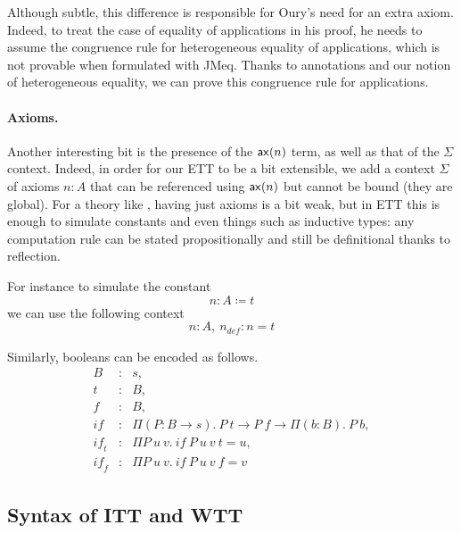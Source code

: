 Although subtle, this difference is responsible for Oury's need for an
extra axiom. Indeed, to treat the case of equality of applications in
his proof, he needs to assume the congruence rule for heterogeneous
equality of applications, which is not provable when formulated with
\acrshort{JMeq}. Thanks to annotations and our notion of heterogeneous equality,
we can prove this congruence rule for applications.

\paragraph{Axioms.}

Another interesting bit is the presence of the \(\mathsf{ax}(n)\) term, as well as
that of the \(\Sigma\) context. Indeed, in order for our \acrshort{ETT} to be
a bit extensible, we add a context \(\Sigma\) of axioms \(n : A\) that can be
referenced using \(\mathsf{ax}(n)\) but cannot be bound (they are global).
For a theory like \Coq, having just axioms is a bit weak, but in \acrshort{ETT}
this is enough to simulate constants and even things such as inductive types:
any computation rule can be stated propositionally and still be definitional
thanks to reflection.

For instance to simulate the constant
\[
  n : A \coloneqq t
\]
we can use the following context
\[
  n : A,\ n_{\mathit{def}} : n = t
\]

Similarly, booleans can be encoded as follows.
\[
  \begin{array}{lcl}
    B &:& s, \\
    t &:& B, \\
    f &:& B, \\
    \mathit{if} &:& \Pi (P : B \to s).\ P\ t \to P\ f \to \Pi (b : B).\ P\ b, \\
    \mathit{if_t} &:& \Pi P\ u\ v.\ \mathit{if}\ P\ u\ v\ t = u, \\
    \mathit{if_f} &:& \Pi P\ u\ v.\ \mathit{if}\ P\ u\ v\ f = v
  \end{array}
\]

\subsection{Syntax of \acrshort{ITT} and \acrshort{WTT}}

